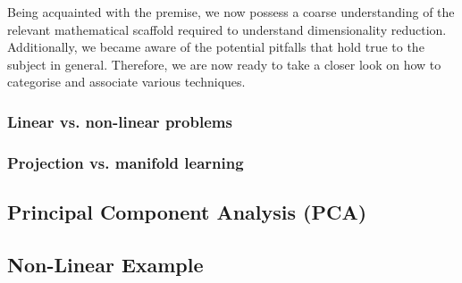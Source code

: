 Being acquainted with the premise, we now possess a coarse understanding of the relevant mathematical scaffold required to understand dimensionality reduction.
Additionally, we became aware of the potential pitfalls that hold true to the subject in general.
Therefore, we are now ready to take a closer look on how to categorise and associate various techniques.

\subsubsection{Linear vs. non-linear problems}

\clearpage

\subsubsection{Projection vs. manifold learning}

\clearpage




\subsection{Principal Component Analysis (PCA)}


\clearpage




\subsection{Non-Linear Example}

\clearpage

